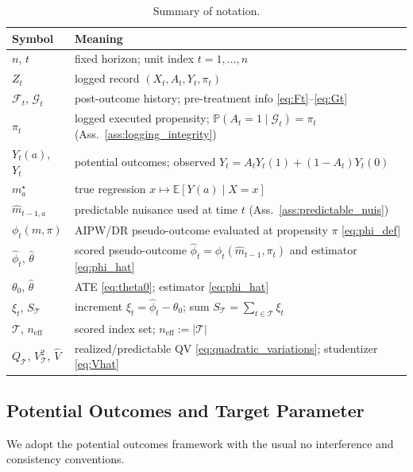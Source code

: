 \documentclass[11pt]{article}
\numberwithin{equation}{section}
\theoremstyle{plain}
\theoremstyle{definition}
\theoremstyle{remark}
\newcommand{\E}{\mathbb{E}}
\newcommand{\Pp}{\mathbb{P}}
\newcommand{\cF}{\mathcal{F}}
\newcommand{\cG}{\mathcal{G}}
\begin{document}
\begin{table}[!htbp]
\centering
\small
\begin{tabular}{@{}ll@{}}
\toprule
Symbol & Meaning \\
\midrule
$n$, $t$ & fixed horizon; unit index $t=1,\dots,n$ \\
$Z_t$ & logged record $(X_t,A_t,Y_t,\pi_t)$ \\
$\cF_t$, $\cG_t$ & post-outcome history; pre-treatment info \eqref{eq:Ft}--\eqref{eq:Gt} \\
$\pi_t$ & logged executed propensity; $\Pp(A_t=1\mid \cG_t)=\pi_t$ (Ass.~\ref{ass:logging_integrity}) \\
$Y_t(a)$, $Y_t$ & potential outcomes; observed $Y_t=A_tY_t(1)+(1-A_t)Y_t(0)$ \\
$m_a^\star$ & true regression $x\mapsto\E[Y(a)\mid X=x]$ \\
$\widehat m_{t-1,a}$ & predictable nuisance used at time $t$ (Ass.~\ref{ass:predictable_nuis}) \\
$\phi_t(m,\pi)$ & AIPW/DR pseudo-outcome evaluated at propensity $\pi$ \eqref{eq:phi_def} \\
$\widehat{\phi}_t$, $\widehat{\theta}$ & scored pseudo-outcome $\widehat{\phi}_t=\phi_t(\widehat m_{t-1},\pi_t)$ and estimator \eqref{eq:phi_hat} \\
$\theta_0$, $\widehat\theta$ & ATE \eqref{eq:theta0}; estimator \eqref{eq:phi_hat} \\
$\xi_t$, $S_{\mathcal{T}}$ & increment $\xi_t=\widehat\phi_t-\theta_0$; sum $S_{\mathcal{T}}=\sum_{t\in\mathcal{T}}\xi_t$ \\
$\mathcal{T}$, $n_{\mathrm{eff}}$ & scored index set; $n_{\mathrm{eff}}:=|\mathcal{T}|$ \\
$Q_{\mathcal{T}}$, $V_{\mathcal{T}}^2$, $\widehat V$ & realized/predictable QV \eqref{eq:quadratic_variations}; studentizer \eqref{eq:Vhat} \\
\bottomrule
\end{tabular}
\caption{Summary of notation.}
\label{tab:notation}
\end{table}



\subsection{Potential Outcomes and Target Parameter}\label{sec:estimand}

We adopt the potential outcomes framework with the usual no interference and consistency conventions.
\end{document}
